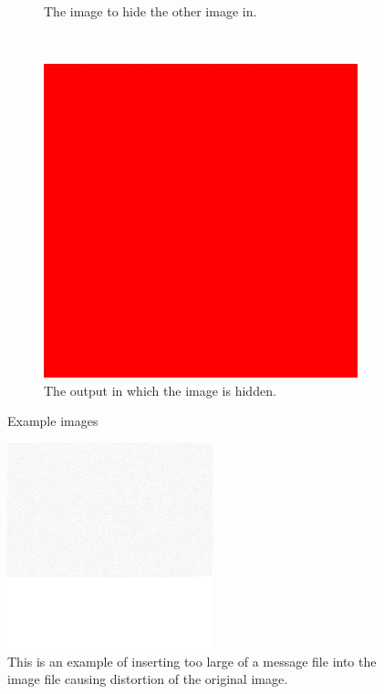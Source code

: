 \documentclass[12pt]{article}
\begin{document}
\begin{figure}[h]
\begin{subfigure}[t]{0.3\textwidth}
			\caption{The image to hide the other image in.}
		\end{subfigure}
		~
		\begin{subfigure}[t]{0.3\textwidth}
			\includegraphics[width=\textwidth]{image/newRed.png}
			\caption{The output in which the image is hidden.}
		\end{subfigure}
		\caption{Example images}
	\end{figure}
	
	\begin{figure}[h]
		\centering
		\includegraphics[keepaspectratio=true, width=0.8\linewidth]{image/bloob.png}
		\caption{This is an example of inserting too large of a message file into the image file causing distortion of the original image.}
	\end{figure}
	
\end{document}
